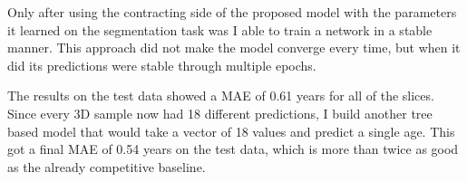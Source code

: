 Only after using the contracting side of the proposed model with the parameters it learned on the segmentation task was I able to train a network in a stable manner. This approach did not make the model converge every time, but when it did its predictions were stable through multiple epochs. 

The results on the test data showed a MAE of 0.61 years for all of the slices. Since every 3D sample now had 18 different predictions, I build another tree based model that would take a vector of 18 values and predict a single age. This got a final MAE of 0.54 years on the test data, which is more than twice as good as the already competitive baseline.

\newpage